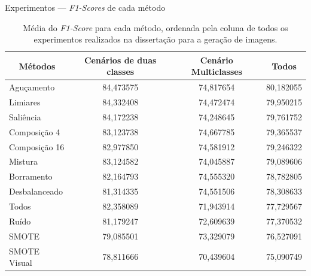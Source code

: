 \documentclass[10pt]{beamer}
\begin{document}
\begin{frame}{Experimentos --- \textit{F1-Scores} de cada método}
  \setlength\leftmargini{1em}
  \begin{table}
    \centering
    \caption{Média do \textit{F1-Score} para cada método, ordenada pela coluna de todos os experimentos realizados na dissertação para a geração de imagens.}
    \footnotesize{
    \begin{tabular}{|l|c|c|c|}
      \hline
      \multicolumn{1}{|c|}{\textbf{Métodos}} & \textbf{Cenários de duas classes} & \textbf{Cenário Multiclasses} & \textbf{Todos} \\ \hline
      Aguçamento                             & 84,473575                         & 74,817654                     & 80,182055      \\ \hline
      Limiares                               & 84,332408                         & 74,472474                     & 79,950215      \\ \hline
      Saliência                              & 84,172238                         & 74,248645                     & 79,761752      \\ \hline
      Composição 4                           & 83,123738                         & 74,667785                     & 79,365537      \\ \hline
      Composição 16                          & 82,977850                         & 74,581912                     & 79,246322      \\ \hline
      Mistura                                & 83,124582                         & 74,045887                     & 79,089606      \\ \hline
      Borramento                             & 82,164793                         & 74,555320                     & 78,782805      \\ \hline
      Desbalanceado                          & 81,314335                         & 74,551506                     & 78,308633      \\ \hline
      Todos                                  & 82,358089                         & 71,943914                     & 77,729567      \\ \hline
      Ruído                                  & 81,179247                         & 72,609639                     & 77,370532      \\ \hline
      SMOTE                                  & 79,085501                         & 73,329079                     & 76,527091      \\ \hline
      SMOTE Visual                           & 78,811666                         & 70,439604                     & 75,090749      \\ \hline
    \end{tabular}
    }
  \end{table}
\end{frame}
\end{document}
